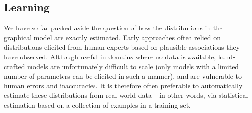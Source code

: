 

\subsection{Learning} 
\label{sec:learning}

We have so far pushed aside the question of how the distributions in the graphical model are exactly estimated.  Early approaches often relied on distributions elicited from human experts based on plausible associations they have observed.  Although useful in domains where no data is available, hand-crafted models are unfortunately difficult to scale (only models with a limited number of parameters can be elicited in such a manner), and are vulnerable to human errors and inaccuracies. It is therefore often preferable to automatically estimate these distributions from real world data -- in other words, via statistical estimation based on a collection of examples in a training set. 

